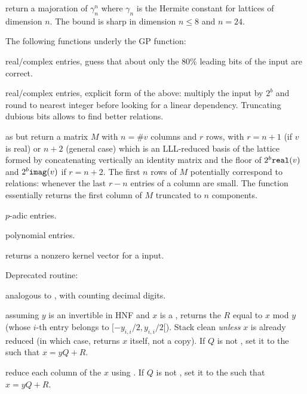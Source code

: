 return a majoration of $\gamma_n^n$ where $\gamma_n$ is the
Hermite constant for lattices of dimension $n$. The bound is sharp in
dimension $n \leq 8$ and $n = 24$.


The following functions underly the  GP function:

 real/complex entries, guess that about only the
80\% leading bits of the input are correct.

 real/complex entries, explicit form of the
above: multiply the input by $2^b$ and round to nearest integer before
looking for a linear dependency. Truncating dubious bits allows to find
better relations.

 as  but return a
matrix $M$ with $n = \#v$ columns and $r$ rows, with $r = n+1$ (if $v$ is
real) or $n+2$ (general case) which is an LLL-reduced basis of the lattice
formed by concatenating vertically an identity matrix and the floor of $2^b
{\tt real}(v)$ and $2^b {\tt imag}(v)$ if $r = n+2$. The first $n$ rows of
$M$ potentially correspond to relations: whenever the last $r-n$ entries of a
column are small. The function  essentially returns the
first column of $M$ truncated to $n$ components.

 $p$-adic entries.

 polynomial entries.

 returns a nonzero kernel vector for a  input.

Deprecated routine:

 analogous to , with
 counting decimal digits.


 assuming $y$ is an
invertible  in HNF and $x$ is a , returns the  $R$
equal to $x$ mod $y$ (whose $i$-th entry belongs to $[-y_{i,i}/2, y_{i,i}/2[$).
Stack clean \emph{unless} $x$ is already reduced (in which case, returns $x$
itself, not a copy). If $Q$ is not , set it to the  such that
$x = yQ + R$.

 reduce
each column of the  $x$ using . If $Q$ is not
, set it to the  such that $x = yQ + R$.

